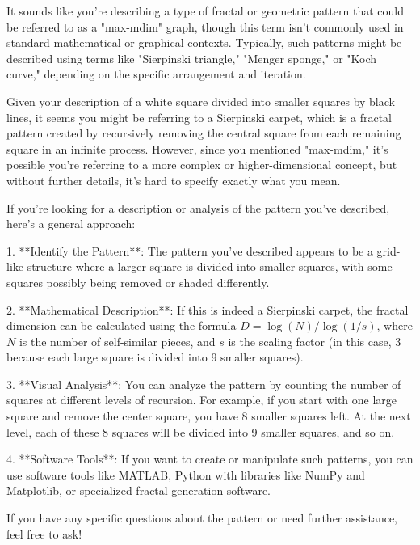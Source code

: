 It sounds like you're describing a type of fractal or geometric pattern that could be referred to as a "max-mdim" graph, though this term isn't commonly used in standard mathematical or graphical contexts. Typically, such patterns might be described using terms like "Sierpinski triangle," "Menger sponge," or "Koch curve," depending on the specific arrangement and iteration.

Given your description of a white square divided into smaller squares by black lines, it seems you might be referring to a Sierpinski carpet, which is a fractal pattern created by recursively removing the central square from each remaining square in an infinite process. However, since you mentioned "max-mdim," it's possible you're referring to a more complex or higher-dimensional concept, but without further details, it's hard to specify exactly what you mean.

If you're looking for a description or analysis of the pattern you've described, here’s a general approach:

1. **Identify the Pattern**: The pattern you've described appears to be a grid-like structure where a larger square is divided into smaller squares, with some squares possibly being removed or shaded differently.

2. **Mathematical Description**: If this is indeed a Sierpinski carpet, the fractal dimension can be calculated using the formula \( D = \log(N) / \log(1/s) \), where \( N \) is the number of self-similar pieces, and \( s \) is the scaling factor (in this case, 3 because each large square is divided into 9 smaller squares).

3. **Visual Analysis**: You can analyze the pattern by counting the number of squares at different levels of recursion. For example, if you start with one large square and remove the center square, you have 8 smaller squares left. At the next level, each of these 8 squares will be divided into 9 smaller squares, and so on.

4. **Software Tools**: If you want to create or manipulate such patterns, you can use software tools like MATLAB, Python with libraries like NumPy and Matplotlib, or specialized fractal generation software.

If you have any specific questions about the pattern or need further assistance, feel free to ask!